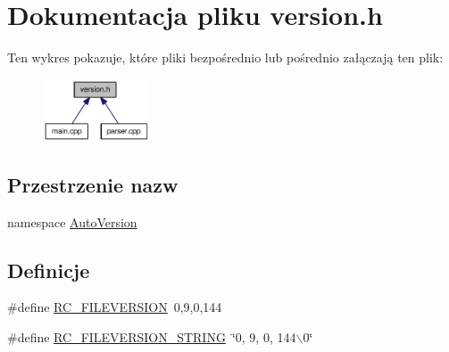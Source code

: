\hypertarget{a00017}{
\section{Dokumentacja pliku version.h}
\label{d4/d51/a00017}
}


Ten wykres pokazuje, które pliki bezpośrednio lub pośrednio załączają ten plik:\nopagebreak
\begin{figure}[H]
\begin{center}
\leavevmode
\includegraphics[width=89pt]{d5/de0/a00050}
\end{center}
\end{figure}
\subsection*{Przestrzenie nazw}
\begin{CompactItemize}
\item 
namespace \hyperlink{a00019}{AutoVersion}
\end{CompactItemize}
\subsection*{Definicje}
\begin{CompactItemize}
\item 
\#define \hyperlink{a00017_0e86d046ea87587e402d375c6b0927c6}{RC\_\-FILEVERSION}~0,9,0,144
\item 
\#define \hyperlink{a00017_4763e81d3c29ec0fab79225d3ec3f1a2}{RC\_\-FILEVERSION\_\-STRING}~\char`\"{}0, 9, 0, 144$\backslash$0\char`\"{}
\end{CompactItemize}

